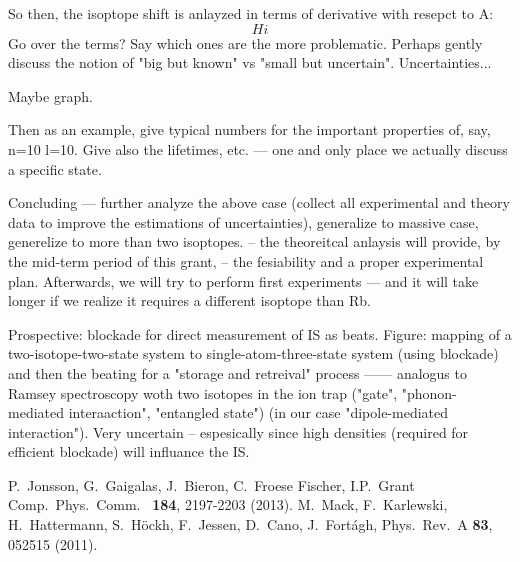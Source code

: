 \documentclass[a4paper,12pt]{article}
\begin{document}
So then, the isoptope shift is anlayzed in terms of derivative with resepct to A:
\begin{equation}
Hi
\end{equation}
Go over the terms? Say which ones are the more problematic. Perhaps gently discuss the notion of "big but known" vs "small but uncertain". Uncertainties... 

Maybe graph.

Then as an example, give typical numbers for the important properties of, say, n=10 l=10. Give also the lifetimes, etc. --- one and only place we actually discuss a specific state.

Concluding
--- further analyze the above case (collect all experimental and theory data to improve the estimations of uncertainties), generalize to massive case, generelize to more than two isoptopes.
-- the theoreitcal anlaysis will provide, by the mid-term period of this grant,
-- the fesiability and a proper experimental plan. Afterwards, we will try to perform first experiments
--- and it will take longer if we realize it requires a different isoptope than Rb.

Prospective:
blockade for direct measurement of IS as beats.
Figure: mapping of a two-isotope-two-state system to single-atom-three-state system (using blockade) and then the beating for a "storage and retreival" process ------ analogus to Ramsey spectroscopy woth two isotopes in the ion trap ("gate", "phonon-mediated interaaction", "entangled state") (in our case "dipole-mediated interaction"). Very uncertain -- espesically since high densities (required for efficient blockade) will influance the IS.



\begin{thebibliography}{2}

 P.~Jonsson, G.~Gaigalas, J.~Bieron, C.~Froese Fischer, I.P.~Grant
  Comp.~Phys.~Comm.~ {\bf 184}, 2197-2203 (2013).
  M.~Mack, F.~Karlewski, H.~Hattermann, S.~H\"ockh, F.~Jessen, D.~Cano, J.~Fort\'agh,
  Phys.\ Rev.\ A {\bf 83}, 052515 (2011).

\end{thebibliography}
\end{document}
